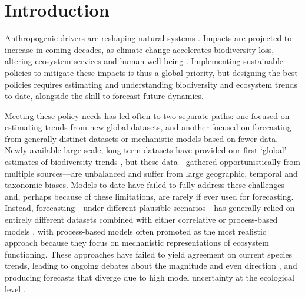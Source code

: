 \documentclass[11pt]{article}
\begin{document}
\linenumbers

\section{Introduction}

Anthropogenic drivers are reshaping natural systems \citep{Diaz2019}. Impacts are projected to increase in coming decades, as climate change accelerates biodiversity loss, altering ecosystem services and human well-being \citep{IPBES2019}.
Implementing sustainable policies to mitigate these impacts is thus a global priority, but designing the best policies requires estimating and understanding biodiversity and ecosystem trends to date, alongside the skill to forecast future dynamics. %

Meeting these policy needs has led often to two separate paths: one focused on estimating trends from new global datasets, and another focused on forecasting from generally distinct datasets or mechanistic models based on fewer data. 
Newly available large-scale, long-term datasets have provided our first `global' estimates of biodiversity trends \citep[e.g.][]{loh2005living,Dornelas2018}, but these data---gathered opportunistically from multiple sources---are unbalanced and suffer from large geographic, temporal and taxonomic biases. Models to date have failed to fully address these challenges and, perhaps because of these limitations, are rarely if ever used for forecasting.
Instead, forecasting---under different plausible scenarios---has generally relied on entirely different datasets combined with either correlative or process-based models \citep{IPBES2019}, with process-based models often promoted as the most realistic approach \citep{Urban2016, Pilowsky2022} because they focus on mechanistic representations of ecosystem functioning. These approaches have failed to yield agreement on current species trends, leading to ongoing debates about the magnitude and even direction \citep{Dornelas2014, Leung2020, Buschke2021, Johnson2024}, and producing forecasts that diverge due to high model uncertainty at the ecological level \citep{Cheaib2012, Thuiller2019}.
\end{document}
